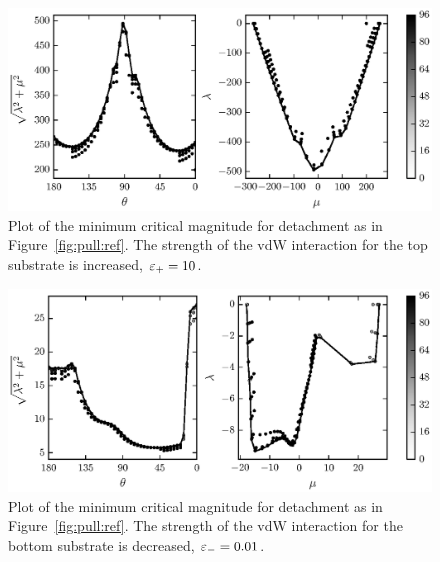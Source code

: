 	\begin{figure}[t]
		\begin{center}
			\includegraphics{./fig/ch3/pull/et10/grid.eps}
		\end{center}		
		\caption{Plot of the minimum critical magnitude for detachment as in Figure~\ref{fig:pull:ref}. The strength of the vdW interaction for the top substrate is increased, $\varepsilon_+=10$.
		\label{fig:pull:et10}}
	\end{figure}

	\begin{figure}[t]
		\begin{center}
			\includegraphics{./fig/ch3/pull/eb0.01/grid.eps}
		\end{center}		
		\caption{Plot of the minimum critical magnitude for detachment as in Figure~\ref{fig:pull:ref}. The strength of the vdW interaction for the bottom substrate is decreased, $\varepsilon_-=0.01$. 
		\label{fig:pull:eb0.01}}
	\end{figure}
	
